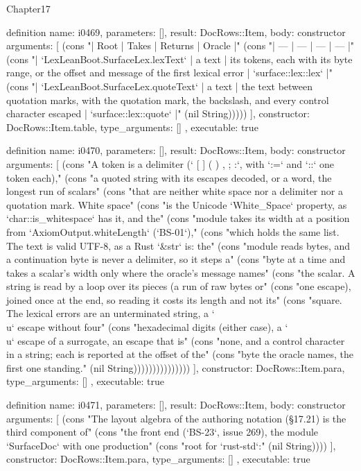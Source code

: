 \begin{lexlean}{Chapter17}
\begin{semanticmodule}
definition{
  name: i0469,
  parameters: [],
  result: DocRows::Item,
  body: constructor{
    arguments: [
      (cons "| Root | Takes | Returns | Oracle |" (cons "| --- | --- | --- | --- |" (cons "| `LexLeanBoot.SurfaceLex.lexText` | a text | its tokens, each with its byte range, or the offset and message of the first lexical error | `surface::lex::lex` |" (cons "| `LexLeanBoot.SurfaceLex.quoteText` | a text | the text between quotation marks, with the quotation mark, the backslash, and every control character escaped | `surface::lex::quote` |" (nil String)))))
    ],
    constructor: DocRows::Item.table,
    type_arguments: []
  },
  executable: true
}

definition{
  name: i0470,
  parameters: [],
  result: DocRows::Item,
  body: constructor{
    arguments: [
      (cons "A token is a delimiter (`{ } [ ] ( ) , ; :`, with `:=` and `::` one token each)," (cons "a quoted string with its escapes decoded, or a word, the longest run of scalars" (cons "that are neither white space nor a delimiter nor a quotation mark. White space" (cons "is the Unicode `White_Space` property, as `char::is_whitespace` has it, and the" (cons "module takes its width at a position from `AxiomOutput.whiteLength` (`BS-01`)," (cons "which holds the same list. The text is valid UTF-8, as a Rust `&str` is: the" (cons "module reads bytes, and a continuation byte is never a delimiter, so it steps a" (cons "byte at a time and takes a scalar's width only where the oracle's message names" (cons "the scalar. A string is read by a loop over its pieces (a run of raw bytes or" (cons "one escape), joined once at the end, so reading it costs its length and not its" (cons "square. The lexical errors are an unterminated string, a `\\u` escape without four" (cons "hexadecimal digits (either case), a `\\u` escape of a surrogate, an escape that is" (cons "none, and a control character in a string; each is reported at the offset of the" (cons "byte the oracle names, the first one standing." (nil String)))))))))))))))
    ],
    constructor: DocRows::Item.para,
    type_arguments: []
  },
  executable: true
}

definition{
  name: i0471,
  parameters: [],
  result: DocRows::Item,
  body: constructor{
    arguments: [
      (cons "The layout algebra of the authoring notation (§17.21) is the third component of" (cons "the front end (`BS-23`, issue 269), the module `SurfaceDoc` with one production" (cons "root for `rust-std`:" (nil String))))
    ],
    constructor: DocRows::Item.para,
    type_arguments: []
  },
  executable: true
}


\end{semanticmodule}
\end{lexlean}
